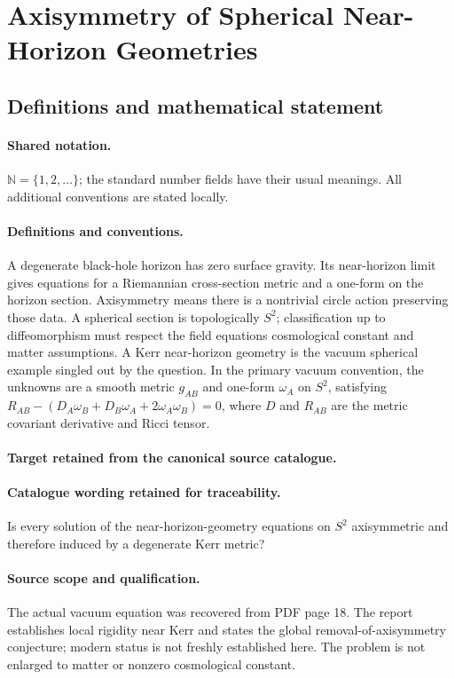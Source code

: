 \documentclass[11pt]{article}
\begin{document}
\section{Axisymmetry of Spherical Near-Horizon Geometries}\label{statement}

\subsection{Definitions and mathematical statement}

\paragraph{Shared notation.}$\mathbb N=\{1,2,\ldots\}$; the standard number fields have their usual meanings. All additional conventions are stated locally.


\paragraph{Definitions and conventions.}
A degenerate black-hole horizon has zero surface gravity. Its near-horizon limit gives equations for a Riemannian cross-section metric and a one-form on the horizon section. Axisymmetry means there is a nontrivial circle action preserving those data. A spherical section is topologically $S^2$; classification up to diffeomorphism must respect the field equation\textquotesingle s cosmological constant and matter assumptions. A Kerr near-horizon geometry is the vacuum spherical example singled out by the question. In the primary vacuum convention, the unknowns are a smooth metric $g_{AB}$ and one-form $\omega_A$ on $S^2$, satisfying $R_{AB}-(D_A\omega_B+D_B\omega_A+2\omega_A\omega_B)=0$, where $D$ and $R_{AB}$ are the metric covariant derivative and Ricci tensor.

\paragraph{Target retained from the canonical source catalogue.}
\paragraph{Catalogue wording retained for traceability.}
Is every solution of the near-horizon-geometry equations on $S^2$ axisymmetric and therefore induced by a degenerate Kerr metric?

\paragraph{Source scope and qualification.}
The actual vacuum equation was recovered from PDF page 18. The report establishes local rigidity near Kerr and states the global removal-of-axisymmetry conjecture; modern status is not freshly established here. The problem is not enlarged to matter or nonzero cosmological constant.
\end{document}
